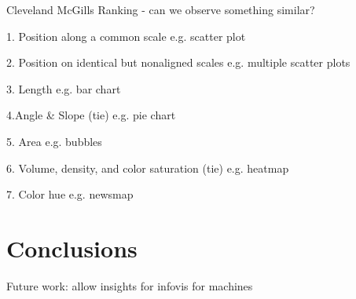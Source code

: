 \documentclass[journal]{vgtc}                %
\begin{document}
Cleveland McGills Ranking - can we observe something similar?

1. Position along a common scale e.g. scatter plot

2. Position on identical but nonaligned scales e.g. multiple scatter plots

3. Length e.g. bar chart

4.Angle \& Slope (tie) e.g. pie chart

5. Area e.g. bubbles

6. Volume, density, and color saturation (tie) e.g. heatmap

7. Color hue e.g. newsmap

\section{Conclusions}

Future work: allow insights for infovis for machines



%

%
%
%


\end{document}
